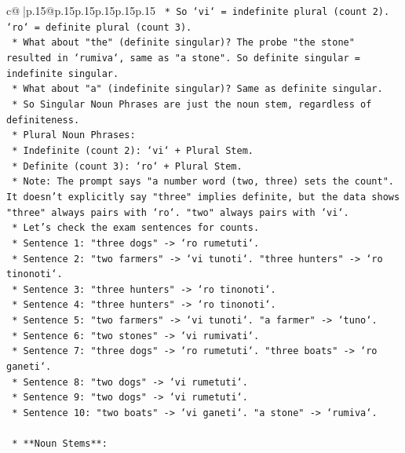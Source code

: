\documentclass{article}
\begin{document}
{\begin{supertabular}{c@{$\;$}|p{.15\linewidth}@{}p{.15\linewidth}p{.15\linewidth}p{.15\linewidth}p{.15\linewidth}p{.15\linewidth}}
{{{\texttt{        *   So `vi` = indefinite plural (count 2). `ro` = definite plural (count 3).} \\
\texttt{        *   What about "the" (definite singular)? The probe "the stone" resulted in `rumiva`, same as "a stone". So definite singular = indefinite singular.} \\
\texttt{        *   What about "a" (indefinite singular)? Same as definite singular.} \\
\texttt{        *   So Singular Noun Phrases are just the noun stem, regardless of definiteness.} \\
\texttt{        *   Plural Noun Phrases:} \\
\texttt{            *   Indefinite (count 2): `vi` + Plural Stem.} \\
\texttt{            *   Definite (count 3): `ro` + Plural Stem.} \\
\texttt{            *   Note: The prompt says "a number word (two, three) sets the count". It doesn't explicitly say "three" implies definite, but the data shows "three" always pairs with `ro`. "two" always pairs with `vi`.} \\
\texttt{            *   Let's check the exam sentences for counts.} \\
\texttt{            *   Sentence 1: "three dogs" {-}> `ro rumetuti`.} \\
\texttt{            *   Sentence 2: "two farmers" {-}> `vi tunoti`. "three hunters" {-}> `ro tinonoti`.} \\
\texttt{            *   Sentence 3: "three hunters" {-}> `ro tinonoti`.} \\
\texttt{            *   Sentence 4: "three hunters" {-}> `ro tinonoti`.} \\
\texttt{            *   Sentence 5: "two farmers" {-}> `vi tunoti`. "a farmer" {-}> `tuno`.} \\
\texttt{            *   Sentence 6: "two stones" {-}> `vi rumivati`.} \\
\texttt{            *   Sentence 7: "three dogs" {-}> `ro rumetuti`. "three boats" {-}> `ro ganeti`.} \\
\texttt{            *   Sentence 8: "two dogs" {-}> `vi rumetuti`.} \\
\texttt{            *   Sentence 9: "two dogs" {-}> `vi rumetuti`.} \\
\texttt{            *   Sentence 10: "two boats" {-}> `vi ganeti`. "a stone" {-}> `rumiva`.} \\
\\ 
\texttt{    *   **Noun Stems**:} \\
}}}
\end{supertabular}}
\end{document}
